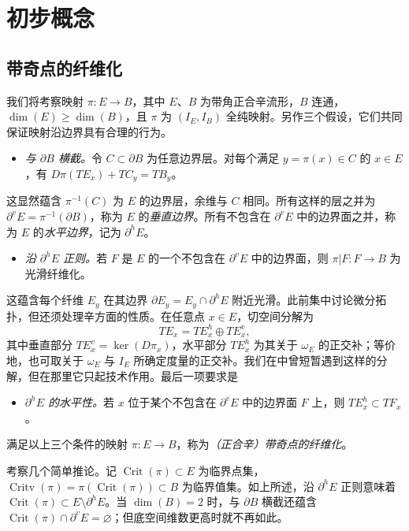 \section{初步概念}\label{sec:15}
\subsection{带奇点的纤维化}\label{sec:15a}
我们将考察映射 $\pi:E\to B$，其中 $E$、$B$ 为带角正合辛流形，$B$ 连通，$\dim(E)\geq\dim(B)$，且 $\pi$ 为 $(I_E,I_B)$ 全纯映射。另作三个假设，它们共同保证映射沿边界具有合理的行为。
\begin{itemize}
\item \emph{与 $\partial B$ 横截。}令 $C\subset\partial B$ 为任意边界层。对每个满足 $y=\pi(x)\in C$ 的 $x\in E$，有 $D\pi(TE_x)+TC_y=TB_y$。
\end{itemize}
这显然蕴含 $\pi^{-1}(C)$ 为 $E$ 的边界层，余维与 $C$ 相同。所有这样的层之并为 $\partial^vE=\pi^{-1}(\partial B)$，称为 $E$ 的\emph{垂直边界}。所有不包含在 $\partial^vE$ 中的边界面之并，称为 $E$ 的\emph{水平边界}，记为 $\partial^hE$。
\begin{itemize}
\item \emph{沿 $\partial^hE$ 正则。}若 $F$ 是 $E$ 的一个不包含在 $\partial^vE$ 中的边界面，则 $\pi|F:F\to B$ 为光滑纤维化。
\end{itemize}
这蕴含每个纤维 $E_y$ 在其边界 $\partial E_y=E_y\cap\partial^hE$ 附近光滑。此前集中讨论微分拓扑，但还须处理辛方面的性质。在任意点 $x\in E$，切空间分解为
\begin{equation}\label{eq:15.1}
TE_x=TE_x^h\oplus TE_x^v,
\end{equation}
其中垂直部分 $TE_x^v=\ker(D\pi_x)$，水平部分 $TE_x^h$ 为其关于 $\omega_E$ 的正交补；等价地，也可取关于 $\omega_E$ 与 $I_E$ 所确定度量的正交补。我们在中曾短暂遇到这样的分解，但在那里它只起技术作用。最后一项要求是
\begin{itemize}
\item \emph{$\partial^hE$ 的水平性。}若 $x$ 位于某个不包含在 $\partial^vE$ 中的边界面 $F$ 上，则 $TE_x^h\subset TF_x$。
\end{itemize}
满足以上三个条件的映射 $\pi:E\to B$，称为\emph{（正合辛）带奇点的纤维化}。

考察几个简单推论。记 $\operatorname{Crit}(\pi)\subset E$ 为临界点集，$\operatorname{Critv}(\pi)=\pi(\operatorname{Crit}(\pi))\subset B$ 为临界值集。如上所述，沿 $\partial^hE$ 正则意味着 $\operatorname{Crit}(\pi)\subset E\setminus\partial^hE$。当 $\dim(B)=2$ 时，与 $\partial B$ 横截还蕴含 $\operatorname{Crit}(\pi)\cap\partial^vE=\varnothing$；但底空间维数更高时就不再如此。

